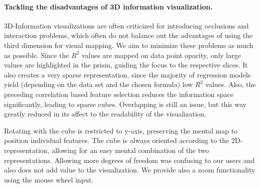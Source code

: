 \documentclass[journal]{style/vgtc} 			          %
\begin{document}
\paragraph{Tackling the disadvantages of 3D information visualization.}
3D-Information visualizations are often criticized for introducing occlusions and interaction problems, which often do not balance out the advantages of using the third dimension for visual mapping.
We aim to minimize these problems as much as possible.
Since the $R^2$ values are mapped on data point opacity, only large values are highlighted in the prism, guiding the focus to the respective slices.
It also creates a very sparse representation, since the majority of regression models yield (depending on the data set and the chosen formula) low $R^2$ values.
Also, the preceding correlation based feature selection reduces the information space significantly, leading to sparse cubes.
Overlapping is still an issue, but this way greatly reduced in its affect to the readability of the visualization.

Rotating with the cube is restricted to y-axis, preserving the mental map to position individual features.
The cube is always oriented according to the 2D-representation, allowing for an easy mental combination of the two representations.
Allowing more degrees of freedom was confusing to our users and also does not add value to the visualization.
We provide also a zoom functionality using the mouse wheel input.
\end{document}
